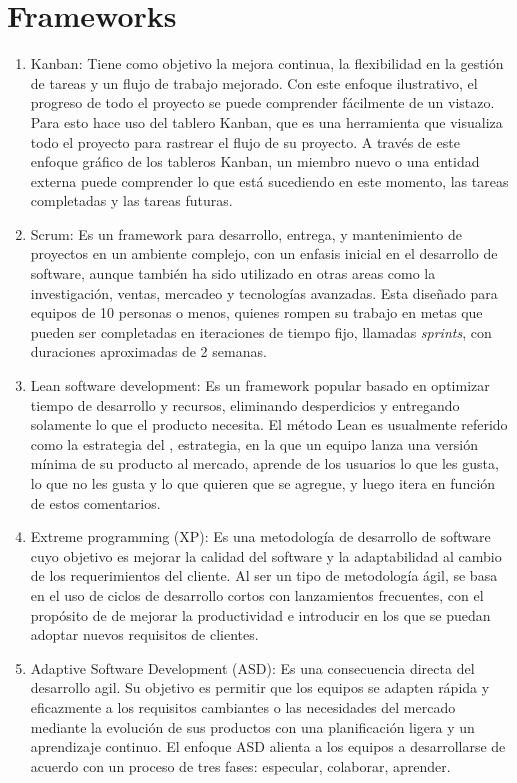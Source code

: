     \section{Frameworks}

    \begin{enumerate}
        \item Kanban: Tiene como objetivo la mejora continua, la flexibilidad en la gestión de tareas y un flujo de trabajo mejorado. Con este enfoque ilustrativo, el progreso de todo el proyecto se puede comprender fácilmente de un vistazo. Para esto hace uso del tablero Kanban, que es una herramienta que visualiza todo el proyecto para rastrear el flujo de su proyecto. A través de este enfoque gráfico de los tableros Kanban, un miembro nuevo o una entidad externa puede comprender lo que está sucediendo en este momento, las tareas completadas y las tareas futuras.
        \item Scrum: Es un framework para desarrollo, entrega, y mantenimiento de proyectos en un ambiente complejo, con un enfasis inicial en el desarrollo de software, aunque también ha sido utilizado en otras areas como la investigación, ventas, mercadeo y tecnologías avanzadas. Esta diseñado para equipos de 10 personas o menos, quienes rompen su trabajo en metas que pueden ser completadas en iteraciones de tiempo fijo, llamadas \emph{sprints}, con duraciones aproximadas de 2 semanas. 
        \item Lean software development: Es un framework popular basado en optimizar tiempo de desarrollo y recursos, eliminando desperdicios y entregando solamente lo que el producto necesita. El método Lean es usualmente referido como la estrategia del , 
        estrategia, en la que un equipo lanza una versión mínima de su producto al mercado, aprende de los usuarios lo que les gusta, lo que no les gusta y lo que quieren que se agregue, y luego itera en función de estos comentarios.
        \item Extreme programming (XP): Es una metodología de desarrollo de software cuyo objetivo es mejorar la calidad del software y la adaptabilidad al cambio de los requerimientos del cliente. Al ser un tipo de metodología ágil, se basa en el uso de ciclos de desarrollo cortos con lanzamientos frecuentes, con el propósito de de mejorar la productividad e introducir  en los que se puedan adoptar nuevos requisitos de clientes.
        \item Adaptive Software Development (ASD): Es una consecuencia directa del desarrollo agil. Su objetivo es permitir que los equipos se adapten rápida y eficazmente a los requisitos cambiantes o las necesidades del mercado mediante la evolución de sus productos con una planificación ligera y un aprendizaje continuo. El enfoque ASD alienta a los equipos a desarrollarse de acuerdo con un proceso de tres fases: especular, colaborar, aprender. 

\end{enumerate}
